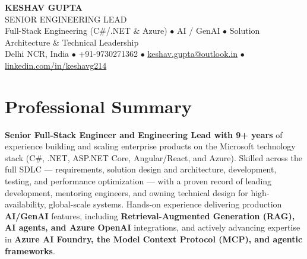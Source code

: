 \documentclass[10pt,a4paper]{article}
\begin{document}
\begin{center}
    {\Huge \textbf{\color{primary} KESHAV GUPTA}} \\ \vspace{3pt}
    {\large \color{primary2} SENIOR ENGINEERING LEAD} \\ \vspace{2pt}
    {\small \color{darkgrey} Full-Stack Engineering (C\#/.NET \& Azure) $\bullet$ AI / GenAI $\bullet$ Solution Architecture \& Technical Leadership} \\ \vspace{4pt}
    \small
    Delhi NCR, India $\bullet$ +91-9730271362 $\bullet$ \href{mailto:keshav.gupta@outlook.in}{keshav.gupta@outlook.in} $\bullet$ \href{https://linkedin.com/in/keshavg214}{linkedin.com/in/keshavg214}
\end{center}

\section{Professional Summary}
\noindent
\textbf{Senior Full-Stack Engineer and Engineering Lead with 9+ years} of experience building and scaling enterprise products on the Microsoft technology stack (C\#, .NET, ASP.NET Core, Angular/React, and Azure). Skilled across the full SDLC --- requirements, solution design and architecture, development, testing, and performance optimization --- with a proven record of leading development, mentoring engineers, and owning technical design for high-availability, global-scale systems. Hands-on experience delivering production \textbf{AI/GenAI} features, including \textbf{Retrieval-Augmented Generation (RAG), AI agents, and Azure OpenAI} integrations, and actively advancing expertise in \textbf{Azure AI Foundry, the Model Context Protocol (MCP), and agentic frameworks}.

\end{document}

